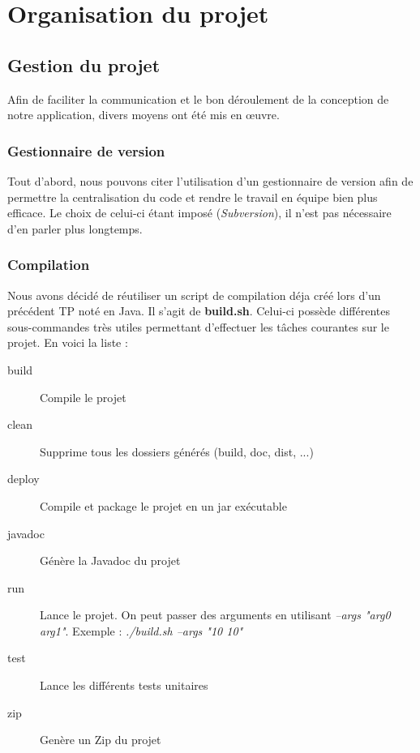 \chapter{Organisation du projet}

	\section{Gestion du projet}

		Afin de faciliter la communication et le bon déroulement de la conception de notre application, divers moyens ont été mis en œuvre.

		\subsection{Gestionnaire de version}

			Tout d'abord, nous pouvons citer l'utilisation d'un gestionnaire de version afin de permettre la centralisation du code et rendre le travail en équipe bien plus efficace. Le choix de celui-ci étant imposé (\textit{Subversion}), il n'est pas nécessaire d'en parler plus longtemps.

		\subsection{Compilation}

			Nous avons décidé de réutiliser un script de compilation déja créé lors d'un précédent TP noté en Java. Il s'agit de \textbf{build.sh}. Celui-ci possède différentes sous-commandes très utiles permettant d'effectuer les tâches courantes sur le projet. En voici la liste :

			\begin{description}
				\item[build]{Compile le projet}
				\item[clean]{Supprime tous les dossiers générés (build, doc, dist, ...)}
				\item[deploy]{Compile et package le projet en un jar exécutable}
				\item[javadoc]{Génère la Javadoc du projet}
				\item[run]{Lance le projet. On peut passer des arguments en utilisant \textit{--args "arg0 arg1"}. Exemple : \textit{./build.sh --args "10 10"}}
				\item[test]{Lance les différents tests unitaires}
				\item[zip]{Genère un Zip du projet}
			\end{description}

